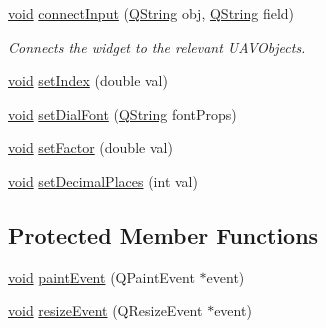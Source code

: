 \begin{DoxyCompactItemize}
\item 
\hyperlink{group___u_a_v_objects_plugin_ga444cf2ff3f0ecbe028adce838d373f5c}{void} \hyperlink{group___linear_dial_plugin_gae8c680251e4f8898f8653b6aede9fc81}{connect\-Input} (\hyperlink{group___u_a_v_objects_plugin_gab9d252f49c333c94a72f97ce3105a32d}{\-Q\-String} obj, \hyperlink{group___u_a_v_objects_plugin_gab9d252f49c333c94a72f97ce3105a32d}{\-Q\-String} field)
\begin{DoxyCompactList}\small\item\em \-Connects the widget to the relevant \-U\-A\-V\-Objects. \end{DoxyCompactList}\item 
\hyperlink{group___u_a_v_objects_plugin_ga444cf2ff3f0ecbe028adce838d373f5c}{void} \hyperlink{group___linear_dial_plugin_ga68d6c562622c590886f5d3efceac4349}{set\-Index} (double val)
\item 
\hyperlink{group___u_a_v_objects_plugin_ga444cf2ff3f0ecbe028adce838d373f5c}{void} \hyperlink{group___linear_dial_plugin_ga65e46979b848fd423f40d6b001e04ffa}{set\-Dial\-Font} (\hyperlink{group___u_a_v_objects_plugin_gab9d252f49c333c94a72f97ce3105a32d}{\-Q\-String} font\-Props)
\item 
\hyperlink{group___u_a_v_objects_plugin_ga444cf2ff3f0ecbe028adce838d373f5c}{void} \hyperlink{group___linear_dial_plugin_gad4c7bf09ce46f89db163dee80784418b}{set\-Factor} (double val)
\item 
\hyperlink{group___u_a_v_objects_plugin_ga444cf2ff3f0ecbe028adce838d373f5c}{void} \hyperlink{group___linear_dial_plugin_ga1c62c1ba4256fcbe4654bb904003c3b5}{set\-Decimal\-Places} (int val)
\end{DoxyCompactItemize}
\subsection*{\-Protected \-Member \-Functions}
\begin{DoxyCompactItemize}
\item 
\hyperlink{group___u_a_v_objects_plugin_ga444cf2ff3f0ecbe028adce838d373f5c}{void} \hyperlink{group___linear_dial_plugin_ga80239da240f9678e9cf4d2de3d9f6568}{paint\-Event} (\-Q\-Paint\-Event $\ast$event)
\item 
\hyperlink{group___u_a_v_objects_plugin_ga444cf2ff3f0ecbe028adce838d373f5c}{void} \hyperlink{group___linear_dial_plugin_ga6f18ff48bf1851067cbd13d56f04fd73}{resize\-Event} (\-Q\-Resize\-Event $\ast$event)
\end{DoxyCompactItemize}


